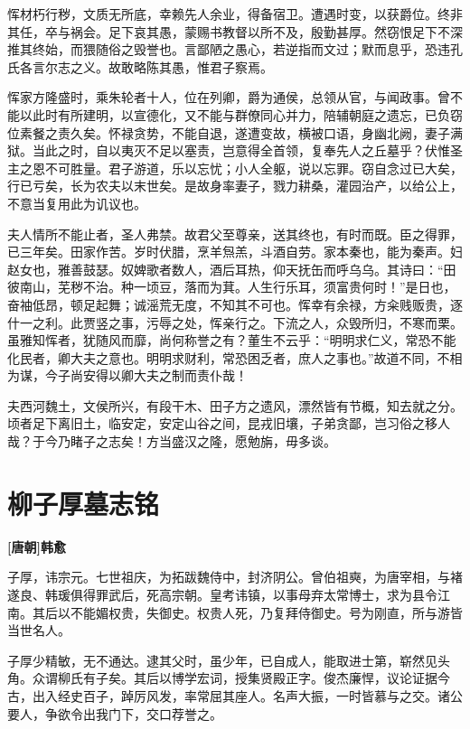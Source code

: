 \documentclass[UTF8,titlepage,oneside]{ctexbook}
\begin{document}
恽材朽行秽，文质无所底，幸赖先人余业，得备宿卫。遭遇时变，以获爵位。终非其任，卒与祸会。足下哀其愚，蒙赐书教督以所不及，殷勤甚厚。然窃恨足下不深推其终始，而猥随俗之毁誉也。言鄙陋之愚心，若逆指而文过；默而息乎，恐违孔氏各言尔志之义。故敢略陈其愚，惟君子察焉。

恽家方隆盛时，乘朱轮者十人，位在列卿，爵为通侯，总领从官，与闻政事。曾不能以此时有所建明，以宣德化，又不能与群僚同心并力，陪辅朝庭之遗忘，已负窃位素餐之责久矣。怀禄贪势，不能自退，遂遭变故，横被口语，身幽北阙，妻子满狱。当此之时，自以夷灭不足以塞责，岂意得全首领，复奉先人之丘墓乎？伏惟圣主之恩不可胜量。君子游道，乐以忘忧；小人全躯，说以忘罪。窃自念过已大矣，行已亏矣，长为农夫以末世矣。是故身率妻子，戮力耕桑，灌园治产，以给公上，不意当复用此为讥议也。

夫人情所不能止者，圣人弗禁。故君父至尊亲，送其终也，有时而既。臣之得罪，已三年矣。田家作苦。岁时伏腊，烹羊炰羔，斗酒自劳。家本秦也，能为秦声。妇赵女也，雅善鼓瑟。奴婢歌者数人，酒后耳热，仰天抚缶而呼乌乌。其诗曰：“田彼南山，芜秽不治。种一顷豆，落而为萁。人生行乐耳，须富贵何时！”是日也，奋袖低昂，顿足起舞；诚滛荒无度，不知其不可也。恽幸有余禄，方籴贱贩贵，逐什一之利。此贾竖之事，污辱之处，恽亲行之。下流之人，众毁所归，不寒而栗。虽雅知恽者，犹随风而靡，尚何称誉之有？董生不云乎：“明明求仁义，常恐不能化民者，卿大夫之意也。明明求财利，常恐困乏者，庶人之事也。”故道不同，不相为谋，今子尚安得以卿大夫之制而责仆哉！

夫西河魏土，文侯所兴，有段干木、田子方之遗风，漂然皆有节概，知去就之分。顷者足下离旧土，临安定，安定山谷之间，昆戎旧壤，子弟贪鄙，岂习俗之移人哉？于今乃睹子之志矣！方当盛汉之隆，愿勉旃，毋多谈。


\chapter*{柳子厚墓志铭}
\begin{center}
	\textbf{[唐朝]韩愈}
\end{center}

子厚，讳宗元。七世祖庆，为拓跋魏侍中，封济阴公。曾伯祖奭，为唐宰相，与褚遂良、韩瑗俱得罪武后，死高宗朝。皇考讳镇，以事母弃太常博士，求为县令江南。其后以不能媚权贵，失御史。权贵人死，乃复拜侍御史。号为刚直，所与游皆当世名人。

子厚少精敏，无不通达。逮其父时，虽少年，已自成人，能取进士第，崭然见头角。众谓柳氏有子矣。其后以博学宏词，授集贤殿正字。俊杰廉悍，议论证据今古，出入经史百子，踔厉风发，率常屈其座人。名声大振，一时皆慕与之交。诸公要人，争欲令出我门下，交口荐誉之。
\end{document}
